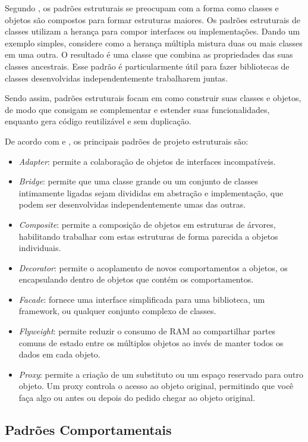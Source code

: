 \documentclass[12pt]{article}
\begin{document}
Segundo \cite{gof}, os padrões estruturais se preocupam com a forma 
como classes e objetos são compostos para formar estruturas maiores. 
Os padrões estruturais de classes utilizam a herança para compor 
interfaces ou implementações. Dando um exemplo simples, considere 
como a herança múltipla mistura duas ou mais classes em uma outra. 
O resultado é uma classe que combina as propriedades das suas 
classes ancestrais. Esse padrão é particularmente útil para fazer 
bibliotecas de classes desenvolvidas independentemente 
trabalharem juntas.

Sendo assim, padrões estruturais focam em como construir suas 
classes e objetos, de modo que consigam se complementar e 
estender suas funcionalidades, enquanto gera código 
reutilizável e sem duplicação.

De acordo com \cite{gof} e \cite{guru}, os principais padrões 
de projeto estruturais são:

\begin{itemize}
\item \textit{Adapter}: permite a colaboração de objetos de interfaces 
incompatíveis.
\item \textit{Bridge}: permite que uma classe grande ou um conjunto 
de classes intimamente ligadas sejam divididas em abstração e 
implementação, que podem ser desenvolvidas independentemente 
umas das outras.
\item \textit{Composite}: permite a composição de objetos 
em estruturas de árvores, habilitando trabalhar com estas 
estruturas de forma parecida a objetos individuais.
\item \textit{Decorator}: permite o acoplamento de novos comportamentos 
a objetos, os encapsulando dentro de objetos que contém 
os comportamentos.
\item \textit{Facade}: fornece uma interface simplificada para 
uma biblioteca, um framework, ou qualquer conjunto 
complexo de classes.
\item \textit{Flyweight}: permite reduzir o consumo de RAM ao 
compartilhar partes comuns de estado entre os múltiplos 
objetos ao invés de manter todos os dados em cada objeto.
\item \textit{Proxy}: permite a criação de um substituto ou um espaço 
reservado para outro objeto. Um proxy controla o acesso ao objeto 
original, permitindo que você faça algo ou antes ou depois do 
pedido chegar ao objeto original.
\end{itemize}

\subsection{Padrões Comportamentais}
\end{document}
